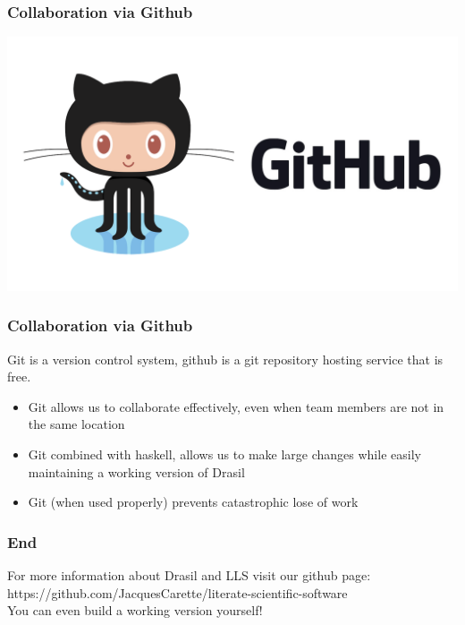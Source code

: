 \documentclass{beamer}
\begin{document}
\begin{frame}
\frametitle{Collaboration via Github}
\includegraphics[scale=0.2]{./Github_Logo.png}
\end{frame}

\begin{frame}
\frametitle{Collaboration via Github}
Git is a version control system, github is a git repository hosting service that is \alert{free}.
\begin{itemize}
 \item<1-> Git allows us to collaborate effectively, even when team members are not in the same location
 \item<2-> Git combined with haskell, allows us to make large changes while easily maintaining a working version of Drasil
 \item<3-> Git \alert{(when used properly)} prevents catastrophic lose of work
\end{itemize}
\end{frame}

\begin{frame}
\frametitle{End}
For more information about Drasil and LLS visit our github page: \\
https://github.com/JacquesCarette/literate-scientific-software \\
\alert{You can even build a working version yourself!}
\end{frame}
\end{document}

